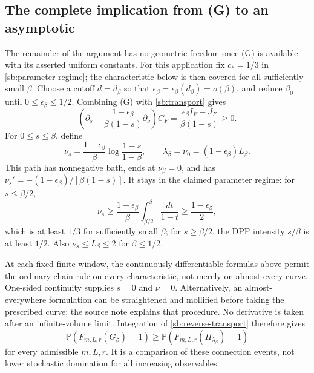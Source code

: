 \documentclass[11pt,a4paper]{article}
\theoremstyle{definition}
\theoremstyle{remark}
\numberwithin{equation}{section}
\begin{document}
\subsection{The complete implication from (G) to an asymptotic}

The remainder of the argument has no geometric freedom once (G) is
available with its asserted uniform constants. For this application fix
$c_*=1/3$ in \eqref{sb:parameter-regime}; the characteristic below is
then covered for all sufficiently small $\beta$. Choose a cutoff $d=d_\beta$
so that $\epsilon_\beta=\epsilon_\beta(d_\beta)=o(\beta)$, and reduce
$\beta_0$ until $0\le\epsilon_\beta\le1/2$. Combining (G) with
\eqref{sb:transport} gives
\begin{equation}
 \left(\partial_s-
  \frac{1-\epsilon_\beta}{\beta(1-s)}\partial_\nu\right)C_F
   =\frac{\epsilon_\beta I_F-J_F}{\beta(1-s)}\ge0.
 \label{sb:reverse-transport}
\end{equation}
For $0\le s\le\beta$, define
\begin{equation}
 \nu_s=\frac{1-\epsilon_\beta}{\beta}
           \log\frac{1-s}{1-\beta},\qquad
 \lambda_\beta=\nu_0=(1-\epsilon_\beta)L_\beta.
 \label{sb:characteristic}
\end{equation}
This path has nonnegative bath, ends at $\nu_\beta=0$, and has
$\nu_s'=-(1-\epsilon_\beta)/[\beta(1-s)]$. It stays in the claimed
parameter regime: for $s\le\beta/2$,
\[
 \nu_s\ge\frac{1-\epsilon_\beta}{\beta}
                  \int_{\beta/2}^{\beta}\frac{dt}{1-t}
       \ge\frac{1-\epsilon_\beta}{2},
\]
which is at least $1/3$ for sufficiently small $\beta$; for
$s\ge\beta/2$, the DPP intensity $s/\beta$ is at least $1/2$.
Also $\nu_s\le L_\beta\le2$ for $\beta\le1/2$.

At each fixed finite window, the continuously differentiable formulas
above permit the ordinary chain rule on every characteristic, not
merely on almost every curve. One-sided continuity supplies $s=0$
and $\nu=0$. Alternatively, an almost-everywhere formulation can be
straightened and mollified before taking the prescribed curve; the
source note  explains that
procedure. No derivative is taken after an infinite-volume limit.
Integration of \eqref{sb:reverse-transport} therefore gives
\begin{equation}
 \mathbb P(F_{m,L,r}(G_\beta)=1)
 \ge\mathbb P(F_{m,L,r}(\Pi_{\lambda_\beta})=1)
 \label{sb:annulus-comparison}
\end{equation}
for every admissible $m,L,r$. It is a comparison of these connection
events, not lower stochastic domination for all increasing observables.
\end{document}
